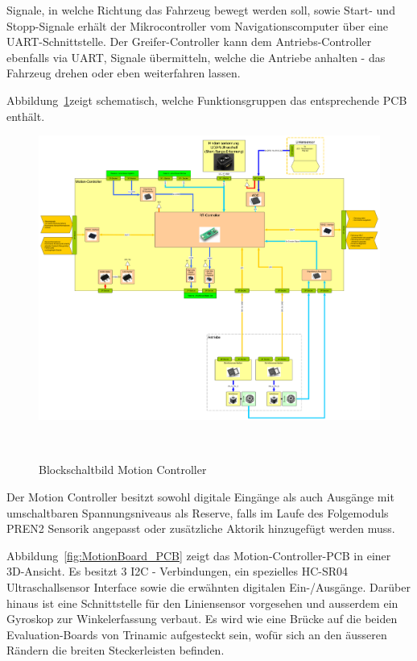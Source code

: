 \documentclass[main.tex]{subfiles} %
\begin{document}
Signale, in welche Richtung das Fahrzeug bewegt werden soll, sowie Start- und
Stopp-Signale erhält der Mikrocontroller vom Navigationscomputer über eine
UART-Schnittstelle. Der Greifer-Controller kann dem Antriebs-Controller
ebenfalls via UART, Signale übermitteln, welche die Antriebe anhalten - das
Fahrzeug drehen oder eben weiterfahren lassen.

Abbildung~\ref{fig:Blockschaltbild_Motioncontroller}zeigt schematisch, welche
Funktionsgruppen das entsprechende PCB enthält.

\begin{figure}[H]
    \centering
    \includegraphics[width = 1\linewidth]{fig_Antriebe_und_Dimensionierung/MotionController_Blockschaltbild.pdf}
    \caption{Blockschaltbild Motion Controller}~\label{fig:Blockschaltbild_Motioncontroller}
\end{figure}

Der Motion Controller besitzt sowohl digitale Eingänge als auch Ausgänge mit
umschaltbaren Spannungsniveaus als Reserve, falls im Laufe des Folgemoduls
PREN2 Sensorik angepasst oder zusätzliche Aktorik hinzugefügt werden muss.

Abbildung~\ref{fig:MotionBoard_PCB} zeigt das Motion-Controller-PCB in einer
3D-Ansicht. Es besitzt 3 I2C - Verbindungen, ein spezielles HC-SR04
Ultraschallsensor Interface sowie die erwähnten digitalen Ein-/Ausgänge.
Darüber hinaus ist eine Schnittstelle für den Liniensensor vorgesehen und
ausserdem ein Gyroskop zur Winkelerfassung verbaut. Es wird wie eine Brücke auf
die beiden Evaluation-Boards von Trinamic aufgesteckt sein, wofür sich an den
äusseren Rändern die breiten Steckerleisten befinden.
\end{document}
